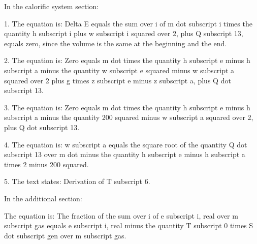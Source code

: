 In the calorific system section:

1. The equation is:
   Delta E equals the sum over i of m dot subscript i times the quantity h subscript i plus w subscript i squared over 2, plus Q subscript 13, equals zero, since the volume is the same at the beginning and the end.

2. The equation is:
   Zero equals m dot times the quantity h subscript e minus h subscript a minus the quantity w subscript e squared minus w subscript a squared over 2 plus g times z subscript e minus z subscript a, plus Q dot subscript 13.

3. The equation is:
   Zero equals m dot times the quantity h subscript e minus h subscript a minus the quantity 200 squared minus w subscript a squared over 2, plus Q dot subscript 13.

4. The equation is:
   w subscript a equals the square root of the quantity Q dot subscript 13 over m dot minus the quantity h subscript e minus h subscript a times 2 minus 200 squared.

5. The text states:
   Derivation of T subscript 6.

In the additional section:

The equation is:
   The fraction of the sum over i of e subscript i, real over m subscript gas equals e subscript i, real minus the quantity T subscript 0 times S dot subscript gen over m subscript gas.
